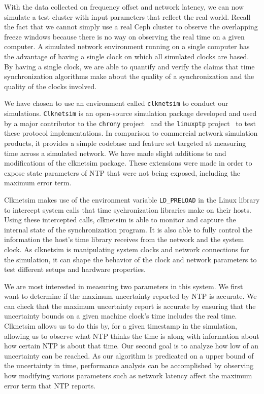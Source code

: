 With the data collected on frequency offset and network latency, we can 
now simulate a test cluster with input parameters that reflect the 
real world. Recall the fact that we cannot simply use a real Ceph
cluster to observe the overlapping freeze windows because there is no
way on observing the real time on a given computer. A
simulated network environment running on a single computer has the
advantage of having a single clock on which all simulated clocks are
based. By having a single clock, we are able to quantify and verify
the claims that time synchronization algorithms make about the quality
of a synchronization and the quality of the clocks involved.


We have chosen to use an environment called \texttt{clknetsim} %
to conduct our simulations. \texttt{Clknetsim} is an open-source simulation 
package developed and used by a major contributor to the \texttt{chrony}
project~\citep{chrony} and the \texttt{linuxptp} project~\citep{linuxptp}
to test these protocol implementations. In
comparison to commercial network simulation products, it provides a 
simple codebase and feature set targeted at measuring 
time across a simulated network. We have made slight additions to and
modifications of the clknetsim package. These extensions were made in 
order to expose state parameters of NTP that were not being exposed, 
including the maximum error term.

Clknetsim makes use of the environment variable \texttt{LD\_PRELOAD} in
the Linux library to intercept system calls that time sychronization 
libraries make on their hosts. Using these intercepted calls, 
clknetsim is able to monitor and capture the internal state of
the synchronization program. It is also able to fully control the
information the host's time library receives from the network and the system
clock. As clknetsim is manipulating system clocks and network
connections for the simulation, it can shape the behavior of the clock
and network parameters to test different setups and hardware properties. 
        
We are most interested in measuring two parameters in
this system. We first want to determine if the maximum uncertainty
reported by NTP is accurate. We can check that the maximum uncertainty
report is accurate by ensuring that the uncertainty bounds on a given machine
clock's time includes the real time.
Clknetsim allows us to do this by, for a
given timestamp in the simulation, allowing us to observe what NTP
thinks the time is along with information about how certain NTP is
about that time. Our second goal is to analyze how low of an
uncertainty can be reached. As our algorithm is predicated on a upper
bound of the uncertainty in time, performance analysis can be
accomplished by observing how modifying various parameters such as
network latency affect the maximum error term that NTP reports.


